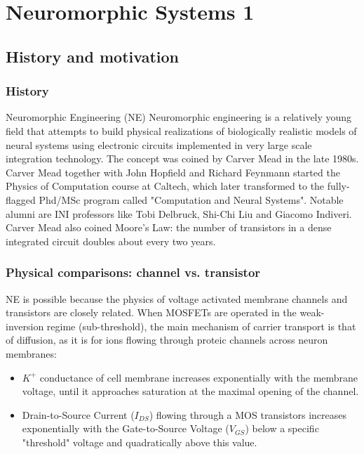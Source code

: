 \documentclass[main]{subfiles}
\begin{document}
\newpage
\section{Neuromorphic Systems 1}

\subsection{History and motivation}

\subsubsection{History}
Neuromorphic Engineering (NE) Neuromorphic engineering is a relatively young field that attempts to build physical realizations of biologically realistic models of neural systems using electronic circuits implemented in very large scale integration technology. The concept was coined by Carver Mead in the late 1980s. Carver Mead together with John Hopfield and Richard Feynmann started the Physics of Computation course at Caltech, which later transformed to the fully-flagged Phd/MSc program called "Computation and Neural Systems". Notable alumni are INI professors like Tobi Delbruck, Shi-Chi Liu and Giacomo Indiveri. Carver Mead also coined Moore's Law:  the number of transistors in a dense integrated circuit doubles about every two years.

\subsubsection{Physical comparisons: channel vs. transistor}

NE is possible because the physics of voltage activated membrane channels and transistors are closely related. When MOSFETs are operated in the weak-inversion regime (sub-threshold), the main mechanism of carrier transport is that of diffusion, as it is for ions flowing through proteic channels across neuron membranes:

\begin{itemize}
    \item $K^+$ conductance of cell membrane increases exponentially with the membrane voltage, until it approaches saturation at the maximal opening of the channel.
    \item Drain-to-Source Current ($I_{DS}$) flowing through a MOS transistors increases exponentially with the Gate-to-Source Voltage ($V_{GS}$) below a specific "threshold" voltage and quadratically above this value.
\end{itemize}{}
\end{document}
